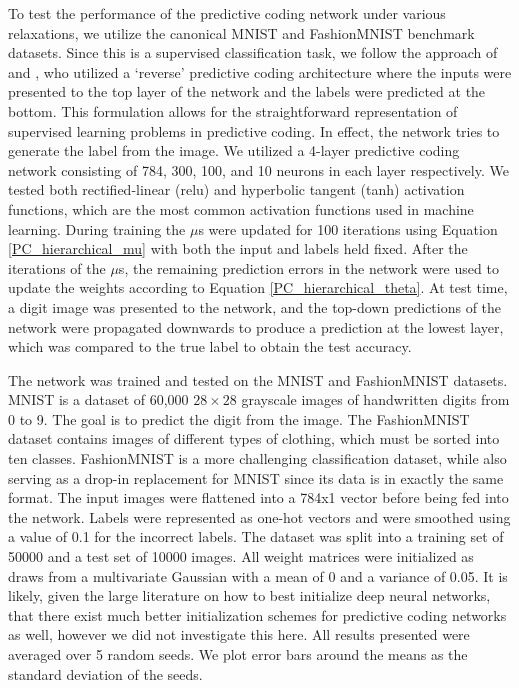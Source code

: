To test the performance of the predictive coding network under various relaxations, we utilize the canonical MNIST and FashionMNIST \citep{xiao2017fashion} benchmark datasets. Since this is a supervised classification task, we follow the approach of \citet{whittington2017approximation} and \citet{millidge2020predictive}, who utilized a `reverse' predictive coding architecture where the inputs were presented to the top layer of the network and the labels were predicted at the bottom. This formulation allows for the straightforward representation of supervised learning problems in predictive coding. In effect, the network tries to generate the label from the image. We utilized a 4-layer predictive coding network consisting of 784, 300, 100, and 10 neurons in each layer respectively. We tested both rectified-linear (relu) and hyperbolic tangent (tanh) activation functions, which are the most common activation functions used in machine learning. During training the $\mu$s were updated for 100 iterations using Equation \ref{PC_hierarchical_mu} with both the input and labels held fixed. After the iterations of the $\mu$s, the remaining prediction errors in the network were used to update the weights according to Equation \ref{PC_hierarchical_theta}. 
At test time, a digit image was presented to the network, and the top-down predictions of the network were propagated downwards to produce a prediction at the lowest layer, which was compared to the true label to obtain the test accuracy. 

The network was trained and tested on the MNIST and FashionMNIST datasets. MNIST is a dataset of 60,000 $28 \times 28$ grayscale images of handwritten digits from 0 to 9. The goal is to predict the digit from the image. The FashionMNIST dataset contains images of different types of clothing, which must be sorted into ten classes. FashionMNIST is a more challenging classification dataset, while also serving as a drop-in replacement for MNIST since its data is in exactly the same format. The input images were flattened into a 784x1 vector before being fed into the network. Labels were represented as one-hot vectors and were smoothed using a value of 0.1 for the incorrect labels. The dataset was split into a training set of 50000 and a test set of 10000 images. All weight matrices were initialized as draws from a multivariate Gaussian with a mean of 0 and a variance of 0.05. It is likely, given the large literature on how to best initialize deep neural networks, that there exist much better initialization schemes for predictive coding networks as well, however we did not investigate this here. All results presented were averaged over 5 random seeds. We plot error bars around the means as the standard deviation of the seeds.


